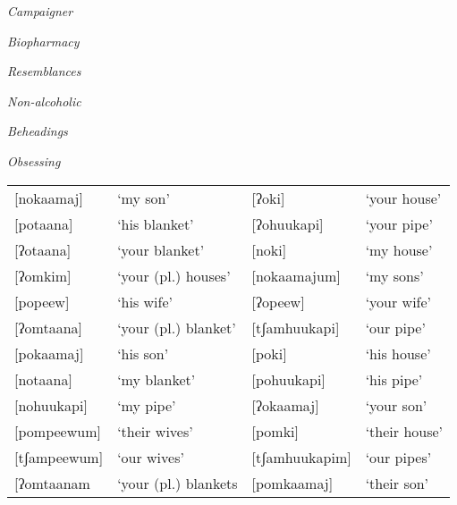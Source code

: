 \documentclass[addpoints]{exam}
\begin{document}
\begin{questions}
        \question[2] \emph{Campaigner}

        \vspace{3cm}

        \question[2] \emph{Biopharmacy}

        \vspace{3cm}

        \question[2] \emph{Resemblances}

        \vspace{3cm}

        \question[2] \emph{Non-alcoholic}

        \vspace{3cm}

        \question[2] \emph{Beheadings}

        \vspace{3cm}

        \question[2] \emph{Obsessing}

        \vspace{3cm}



        \begin{tabular}{l l l l}
          {[}nokaamaj]    & `my son'              & [ʔoki]          & `your house' \\
          {[}potaana]     & `his blanket'         & [ʔohuukapi]     & `your pipe' \\
          {[}ʔotaana]     & `your blanket'        & [noki]          & `my house' \\
          {[}ʔomkim]      & `your (pl.) houses'   & [nokaamajum]    & `my sons' \\
          {[}popeew]      & `his wife'            & [ʔopeew]        & `your wife' \\
          {[}ʔomtaana]    & `your (pl.) blanket'  & [tʃamhuukapi]   & `our pipe' \\
          {[}pokaamaj]    & `his son'             & [poki]          & `his house' \\
          {[}notaana]     & `my blanket'          & [pohuukapi]     & `his pipe' \\
          {[}nohuukapi]   & `my pipe'             & [ʔokaamaj]      & `your son' \\
          {[}pompeewum]   & `their wives'         & [pomki]         & `their house' \\
          {[}tʃampeewum]  & `our wives'           & [tʃamhuukapim]  & `our pipes' \\
          {[}ʔomtaanam    & `your (pl.) blankets  & [pomkaamaj]     & `their son'


\end{tabular}
\end{questions}
\end{document}
